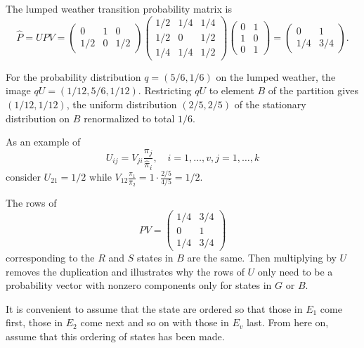 \documentclass[12pt]{article}
\begin{document}
\begin{example}
    The lumped weather transition probability matrix is
    \[
        \hat{P} = UPV =
        \begin{pmatrix}
            0 & 1 & 0 \\
            1/2 & 0 & 1/2
        \end{pmatrix}
        \begin{pmatrix}
            1/2 & 1/4 & 1/4 \\
            1/2 & 0 & 1/2 \\
            1/4 & 1/4 & 1/2
        \end{pmatrix}
        \begin{pmatrix}
            0 & 1 \\
            1 & 0 \\
            0 & 1
        \end{pmatrix}
        =
        \begin{pmatrix}
            0 & 1 \\
            1/4 & 3/4
        \end{pmatrix}
        .
    \]

    For the probability distribution \( q = (5/6, 1/6) \) on the lumped
    weather, the image \( qU = (1/12, 5/6, 1/12) \). Restricting \( qU \)
    to element \( B \) of the partition gives \( (1/12, 1/12) \), the
    uniform distribution \( (2/5, 2/5) \) of the stationary distribution
    on \( B \) renormalized to total \( 1/6 \).

    As an example of
    \[
        U_{ij} = V_{ji} \frac{\pi_j}{\hat{\pi}_{i}}, \quad i = 1, \dots,
        v, j = 1, \dots, k
    \] consider \( U_{21} = 1/2 \) while \( V_{12} \frac{\pi_1}{\hat{\pi}_
    {2}} = 1 \cdot \frac{2/5}{4/5} = 1/2 \).

    The rows of
    \[
        PV =
        \begin{pmatrix}
            1/4 & 3/4 \\
            0 & 1 \\
            1/4 & 3/4
        \end{pmatrix}
    \] corresponding to the \( R \) and \( S \) states in \( B \) are
    the same.  Then multiplying by \( U \) removes the duplication and
    illustrates why the rows of \( U \) only need to be a probability
    vector with nonzero components only for states in \( G \) or \( B \).
\end{example}

It is convenient to assume that the state are ordered so that those in \(
E_1 \) come first, those in \( E_{2} \) come next and so on with those
in \( E_v \) last.  From here on, assume that this ordering of states
has been made.
\end{document}
